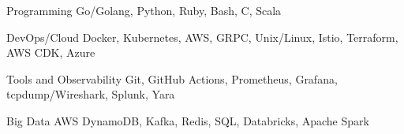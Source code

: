 

\begin{cvskills}

  \cvskill
    {Programming} %
    {Go/Golang, Python, Ruby, Bash, C, Scala} %

  \cvskill
    {DevOps/Cloud} %
    {Docker, Kubernetes, AWS, GRPC, Unix/Linux, Istio, Terraform, AWS CDK, Azure} %

  \cvskill
    {Tools and Observability} %
    {Git, GitHub Actions, Prometheus, Grafana, tcpdump/Wireshark, Splunk, Yara} %

  \cvskill
    {Big Data} %
    {AWS DynamoDB, Kafka, Redis, SQL, Databricks, Apache Spark} %
    
%
\end{cvskills}